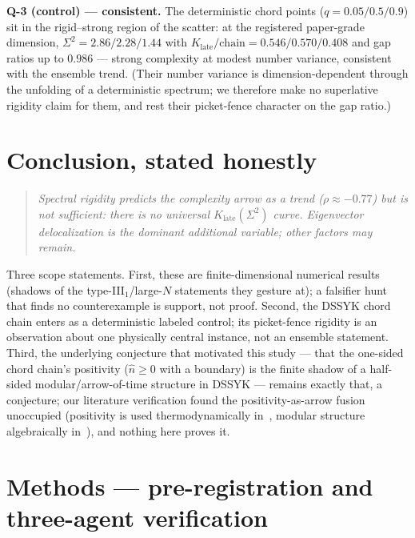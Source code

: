 \documentclass[11pt]{article}
\newcommand{\Klate}{K_{\mathrm{late}}}
\newcommand{\Svar}{\Sigma^2}
\begin{document}
\textbf{Q-3 (control) --- consistent.} The deterministic chord points
($q=0.05/0.5/0.9$) sit in the rigid--strong region of the scatter: at the
registered paper-grade dimension, $\Svar = 2.86/2.28/1.44$ with
$\Klate/\mathrm{chain} = 0.546/0.570/0.408$ and gap ratios up to $0.986$ ---
strong complexity at modest number variance, consistent with the ensemble
trend. (Their number variance is dimension-dependent through the unfolding of
a deterministic spectrum; we therefore make no superlative rigidity claim for
them, and rest their picket-fence character on the gap ratio.)

\section{Conclusion, stated honestly}

\begin{quote}
\emph{Spectral rigidity predicts the complexity arrow as a trend
($\rho\approx-0.77$) but is not sufficient: there is no universal
$\Klate(\Svar)$ curve. Eigenvector delocalization is the dominant additional
variable; other factors may remain.}
\end{quote}

Three scope statements. First, these are finite-dimensional numerical results
(shadows of the type-III$_1$/large-$N$ statements they gesture at); a
falsifier hunt that finds no counterexample is support, not proof. Second, the
DSSYK chord chain enters as a deterministic labeled control; its picket-fence
rigidity is an observation about one physically central instance, not an
ensemble statement. Third, the underlying conjecture that motivated this study
--- that the one-sided chord chain's positivity ($\hat n\ge0$ with a boundary)
is the finite shadow of a half-sided modular/arrow-of-time structure in DSSYK
--- remains exactly that, a conjecture; our literature verification found the
positivity-as-arrow fusion unoccupied (positivity is used thermodynamically
in~\cite{bmp}, modular structure algebraically in~\cite{xu}), and nothing here
proves it.

\section*{Methods --- pre-registration and three-agent verification}
\end{document}
